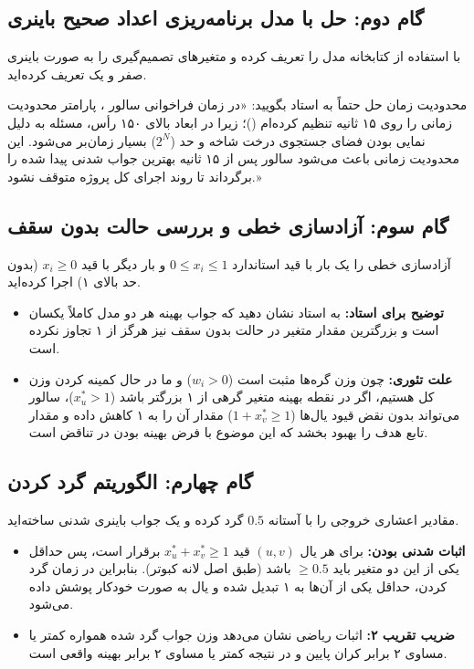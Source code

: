 \documentclass[12pt,a4paper]{article}
\begin{document}
\subsection{گام دوم: حل با مدل برنامه‌ریزی اعداد صحیح باینری }
با استفاده از کتابخانه  مدل را تعریف کرده و متغیرهای تصمیم‌گیری را به صورت باینری صفر و یک تعریف کرده‌اید.
\begin{tipBox}{محدودیت زمان حل }
حتماً به استاد بگویید: «در زمان فراخوانی سالور ، پارامتر محدودیت زمانی را روی ۱۵ ثانیه تنظیم کرده‌ام ()؛ زیرا در ابعاد بالای ۱۵۰ رأس، مسئله به دلیل نمایی بودن فضای جستجوی درخت شاخه و حد ($2^N$) بسیار زمان‌بر می‌شود. این محدودیت زمانی باعث می‌شود سالور پس از ۱۵ ثانیه بهترین جواب شدنی پیدا شده را برگرداند تا روند اجرای کل پروژه متوقف نشود.»
\end{tipBox}

\subsection{گام سوم: آزادسازی خطی  و بررسی حالت بدون سقف}
آزادسازی خطی را یک بار با قید استاندارد $0 \le x_i \le 1$ و بار دیگر با قید $x_i \ge 0$ (بدون حد بالای ۱) اجرا کرده‌اید.
\begin{itemize}
    \item \textbf{توضیح برای استاد:} به استاد نشان دهید که جواب بهینه هر دو مدل کاملاً یکسان است و بزرگترین مقدار متغیر در حالت بدون سقف نیز هرگز از ۱ تجاوز نکرده است.
    \item \textbf{علت تئوری:} چون وزن گره‌ها مثبت است ($w_i > 0$) و ما در حال کمینه کردن وزن کل هستیم، اگر در نقطه بهینه متغیر گرهی از ۱ بزرگتر باشد ($x_u^* > 1$)، سالور می‌تواند بدون نقض قیود یال‌ها ($1 + x_v^* \ge 1$) مقدار آن را به ۱ کاهش داده و مقدار تابع هدف را بهبود بخشد که این موضوع با فرض بهینه بودن در تناقض است.
\end{itemize}

\subsection{گام چهارم: الگوریتم گرد کردن }
مقادیر اعشاری خروجی  را با آستانه $0.5$ گرد کرده و یک جواب باینری شدنی ساخته‌اید.
\begin{itemize}
    \item \textbf{اثبات شدنی بودن:} برای هر یال $(u, v)$ قید $x_u^* + x_v^* \ge 1$ برقرار است، پس حداقل یکی از این دو متغیر باید $\ge 0.5$ باشد (طبق اصل لانه کبوتر). بنابراین در زمان گرد کردن، حداقل یکی از آن‌ها به ۱ تبدیل شده و یال به صورت خودکار پوشش داده می‌شود.
    \item \textbf{ضریب تقریب ۲:} اثبات ریاضی نشان می‌دهد وزن جواب گرد شده همواره کمتر یا مساوی ۲ برابر کران پایین  و در نتیجه کمتر یا مساوی ۲ برابر بهینه واقعی  است.
\end{itemize}
\end{document}
